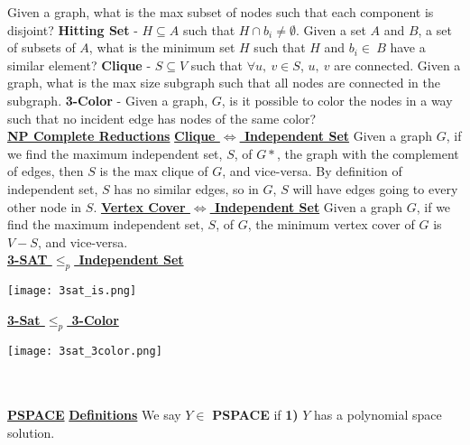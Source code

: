 \documentclass[10pt]{article}
\begin{document}
\begin{multicols*}{3}
Given a graph, what is the max subset of nodes such that each component is disjoint? \newline 
\textbf{Hitting Set} - $H \subseteq A$ such that $H \cap b_i \neq \emptyset$. \newline
Given a set $A$ and $B$, a set of subsets of $A$, what is the minimum set $H$ such that $H$ and $b_i \in\ B$ have a similar element? \newline
\textbf{Clique} - $S \subseteq V$ such that $\forall u,\ v \in S$, $u,\ v$ are connected. \newline
Given a graph, what is the max size subgraph such that all nodes are connected in the subgraph. \newline 
\textbf{3-Color} - Given a graph, $G$, is it possible to color the nodes in a way such that no incident edge has nodes of the same color? \newline \\
\noindent \Large{\underline{\textbf{NP Complete Reductions}}} \newline
\normalsize
\underline{\textbf{Clique $\iff$ Independent Set}} \newline
Given a graph $G$, if we find the maximum independent set, $S$, of $G*$, the graph with the complement of edges, then $S$ is the max clique of $G$, and vice-versa. \newline
By definition of independent set, $S$ has no similar edges, so in $G$, $S$ will have edges going to every other node in $S$. \newline
\underline{\textbf{Vertex Cover $\iff$ Independent Set}} \newline
Given a graph $G$, if we find the maximum independent set, $S$, of $G$, the minimum vertex cover of $G$ is $V - S$, and vice-versa. \newline \\
\underline{\textbf{3-SAT $\leq_p$ Independent Set}} \newline
\centerline{\texttt{[image: 3sat\_is.png]}}
\underline{\textbf{3-Sat $\leq_p$ 3-Color}} \newline
\centerline{\texttt{[image: 3sat\_3color.png]}} \\
\\ 
\noindent \Large{\underline{\textbf{PSPACE}}} \newline
\normalsize
\noindent \underline{\textbf{Definitions}} \newline
We say $Y \in$ \textbf{PSPACE} if \newline
\textbf{1)} $Y$ has a polynomial space solution. \newline \\

\end{multicols*}
\end{document}
